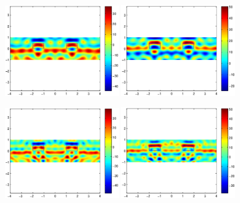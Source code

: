 \documentclass[12pt]{iopart}
\begin{document}
\begin{figure}
	\centering
	\includegraphics[width=0.45\textwidth]{./figure_rough/Bisq_1point5}
	\includegraphics[width=0.45\textwidth]{./figure_rough/Bisq_1point5_real}
	\caption{}\label{I1}
\end{figure}
\begin{figure}
	\centering
	\includegraphics[width=0.45\textwidth]{./figure_rough/Bisq_2}
	\includegraphics[width=0.45\textwidth]{./figure_rough/Bisq_2_real}
	\caption{}\label{I1}
\end{figure}
\end{document}
